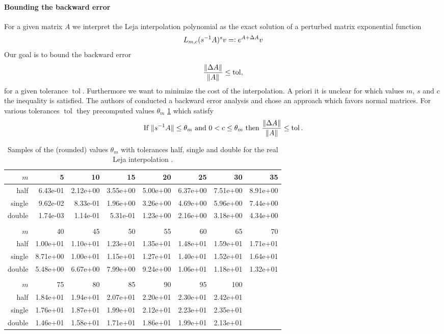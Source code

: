 \documentclass{scrartcl}
\newcommand{\eqdefn}{=\mathrel{\mathop:}}
\begin{document}
\paragraph{Bounding the backward error} For a given matrix $A$ we interpret the Leja interpolation polynomial as the exact solution of a perturbed matrix exponential function
\[
L_{m,c}(s^{-1}A)^sv \eqdefn e^{A + \Delta A}v\\
\]
Our goal is to bound the backward error 
\[
\frac{\lVert\Delta A\rVert}{\lVert A\rVert} \le \operatorname{tol}, 
\]
for a given tolerance $\operatorname{tol}$. Furthermore we want to minimize the cost of the interpolation. A priori it is unclear for which values $m$, $s$ and $c$ the inequality is satisfied. The authors of \cite{lejarev} conducted a backward error analysis and chose an approach which favors normal matrices. For various tolerances $\operatorname{tol}$ they precomputed values $\theta_m$ \ref{table:thetam} which satisfy
\[
\text{If}\ \norm{s^{-1}A}\le \theta_m\ \text{and}\ 0 < c \le \theta_m\ \text{then}\ \frac{\norm{\Delta A}}{\norm{A}} \le \operatorname{tol}.
\]
\begin{table}[tbp]
	\begin{tabular}{r|rrrrrrr}
		$m$ &        5 &       10 &       15 &       20 &       25 &       30 &       35 \\\hline
		half & 6.43e-01 & 2.12e+00 & 3.55e+00 & 5.00e+00 & 6.37e+00 & 7.51e+00 & 8.91e+00 \\
		single & 9.62e-02 & 8.33e-01 & 1.96e+00 & 3.26e+00 & 4.69e+00 & 5.96e+00 & 7.44e+00 \\
		double & 1.74e-03 & 1.14e-01 & 5.31e-01 & 1.23e+00 & 2.16e+00 & 3.18e+00 & 4.34e+00 \\
		\\
		$m$ &       40 &       45 &       50 &       55 &       60 &       65 &       70 \\\hline
		half & 1.00e+01 & 1.10e+01 & 1.23e+01 & 1.35e+01 & 1.48e+01 & 1.59e+01 & 1.71e+01 \\
		single & 8.71e+00 & 1.00e+01 & 1.15e+01 & 1.27e+01 & 1.40e+01 & 1.52e+01 & 1.64e+01 \\
		double & 5.48e+00 & 6.67e+00 & 7.99e+00 & 9.24e+00 & 1.06e+01 & 1.18e+01 & 1.32e+01 \\
		\\
		$m$ &       75 &       80 &       85 &       90 &       95 &      100 \\ \hline
		half & 1.84e+01 & 1.94e+01 & 2.07e+01 & 2.20e+01 & 2.30e+01 & 2.42e+01 \\
		single & 1.76e+01 & 1.87e+01 & 1.99e+01 & 2.12e+01 & 2.23e+01 & 2.35e+01 \\
		double & 1.46e+01 & 1.58e+01 & 1.71e+01 & 1.86e+01 & 1.99e+01 & 2.13e+01
	\end{tabular}
	\caption{Samples of the (rounded) values $\theta_m$ with tolerances half, single and double for the real Leja interpolation \cite[Table 1]{lejarev}.}
	\label{table:thetam}
\end{table}	
\end{document}

